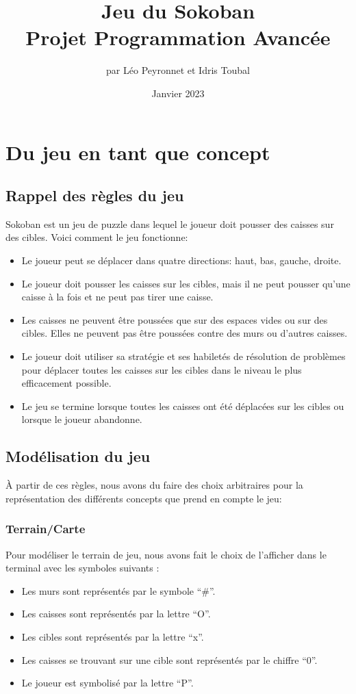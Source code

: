 \documentclass[10pt,a4paper,french,titlepage]{article}
\author{par Léo Peyronnet et Idris Toubal}
\title{Jeu du Sokoban\\[1ex] \large Projet Programmation Avancée}
\date{Janvier 2023}
\begin{document}
\maketitle
\tableofcontents
\newpage
\section{Du jeu en tant que concept}
\subsection{Rappel des règles du jeu}
Sokoban est un jeu de puzzle dans lequel le joueur doit pousser des caisses sur des cibles. Voici comment le jeu fonctionne:
\begin{itemize}
\item Le joueur peut se déplacer dans quatre directions: haut, bas, gauche, droite.
\item Le joueur doit pousser les caisses sur les cibles, mais il ne peut pousser qu'une caisse à la fois et ne peut pas tirer une caisse.
\item Les caisses ne peuvent être poussées que sur des espaces vides ou sur des cibles. Elles ne peuvent pas être poussées contre des murs ou d'autres caisses.
\item Le joueur doit utiliser sa stratégie et ses habiletés de résolution de problèmes pour déplacer toutes les caisses sur les cibles dans le niveau le plus efficacement possible.
\item Le jeu se termine lorsque toutes les caisses ont été déplacées sur les cibles ou lorsque le joueur abandonne.
\end{itemize}

\subsection{Modélisation du jeu}
À partir de ces règles, nous avons du faire des choix arbitraires pour la représentation des différents concepts que prend en compte le jeu:
\subsubsection{Terrain/Carte}
Pour modéliser le terrain de jeu, nous avons fait le choix de l’afficher dans le terminal avec les symboles suivants : 
\begin{itemize}
\item Les murs sont représentés par le symbole “{\#}”.
\item Les caisses sont représentés par la lettre “O”.
\item Les cibles sont représentés par la lettre “x”.
\item Les caisses se trouvant sur une cible sont représentés par le chiffre “0”.
\item Le joueur est symbolisé par la lettre “P”.
\end{itemize}
\end{document}
